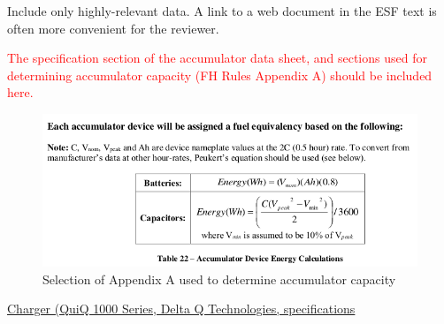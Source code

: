 \documentclass{article}
\begin{document}
Include only highly-relevant data. A link to a web document in the ESF text is often more convenient for the reviewer.

\textcolor{red}{The specification section of the accumulator data sheet, and sections used for determining accumulator capacity (FH Rules Appendix A) should be included here.}



%






\begin{figure}[H]
    \centering
    \includegraphics[width = 0.7 \textwidth]{appendixa}
    \caption{Selection of Appendix A used to determine accumulator capacity}
    \label{appendixa}
\end{figure}

\href{http://delta-q.com/product/quiq-1000-industrial-battery-charger/}{Charger (QuiQ 1000 Series, Delta Q Technologies, specifications }
\end{document}
